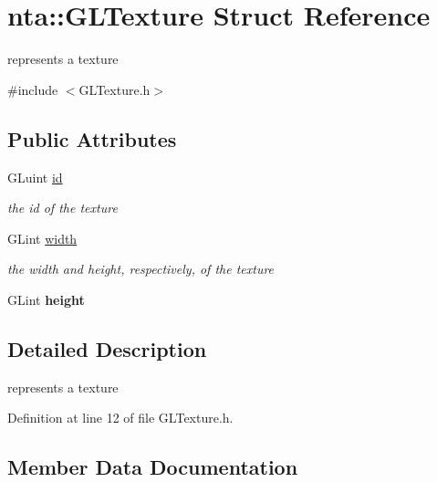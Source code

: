 \hypertarget{structnta_1_1GLTexture}{}\section{nta\+:\+:G\+L\+Texture Struct Reference}
\label{structnta_1_1GLTexture}


represents a texture  




{\ttfamily \#include $<$G\+L\+Texture.\+h$>$}

\subsection*{Public Attributes}
\begin{DoxyCompactItemize}
\item 
\mbox{\label{structnta_1_1GLTexture_aaf0d536088f4b1062d996679b217c0f9}} 
G\+Luint \hyperlink{structnta_1_1GLTexture_aaf0d536088f4b1062d996679b217c0f9}{id}
\begin{DoxyCompactList}\small\item\em the id of the texture \end{DoxyCompactList}\item 
\mbox{\label{structnta_1_1GLTexture_a8f4d13ab2b19b700f76334c46458ac48}} 
G\+Lint \hyperlink{structnta_1_1GLTexture_a8f4d13ab2b19b700f76334c46458ac48}{width}
\begin{DoxyCompactList}\small\item\em the width and height, respectively, of the texture \end{DoxyCompactList}\item 
\mbox{\label{structnta_1_1GLTexture_a4ac2e45733ffb16238eb696d663e62a1}} 
G\+Lint {\bfseries height}
\end{DoxyCompactItemize}


\subsection{Detailed Description}
represents a texture 

Definition at line 12 of file G\+L\+Texture.\+h.



\subsection{Member Data Documentation}
\mbox{\label{structnta_1_1GLTexture_a4ac2e45733ffb16238eb696d663e62a1}} 
